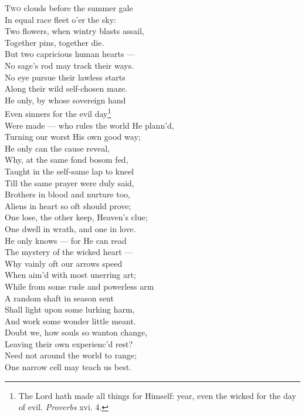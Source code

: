 \textsc{Two} clouds before the summer gale \\
 In equal race fleet o’er the sky: \\
 Two flowers, when wintry blasts assail, \\
 Together pins, together die. \\
  But two capricious human hearts — \\
 No sage’s rod may track their ways. \\
 No eye pursue their lawless starts \\
 Along their wild self-chosen maze. \\
  He only, by whose sovereign hand \\
 Even sinners for the evil day\footnote{The Lord hath made all things for Himself: year, even the wicked for the day of evil. \emph{Proverbs} xvi. 4.} \\
 Were made — who rules the world He plann’d, \\
 Turning our worst His own good way; \\
  He only can the cause reveal, \\
 Why, at the same fond bosom fed, \\
 Taught in the self-same lap to kneel \\
 Till the same prayer were duly said, \\
  Brothers in blood and nurture too, \\
 Aliens in heart so oft should prove; \\
 One lose, the other keep, Heaven’s clue; \\
 One dwell in wrath, and one in love. \\
  He only knows — for He can read \\
 The mystery of the wicked heart — \\
 Why vainly oft our arrows speed \\
 When aim’d with most unerring art; \\
  While from some rude and powerless arm \\
 A random shaft in season sent \\
 Shall light upon some lurking harm, \\
 And work some wonder little meant. \\
  Doubt we, how souls so wanton change, \\
 Leaving their own experienc’d rest? \\
 Need not around the world to range; \\
 One narrow cell may teach us best. \\
